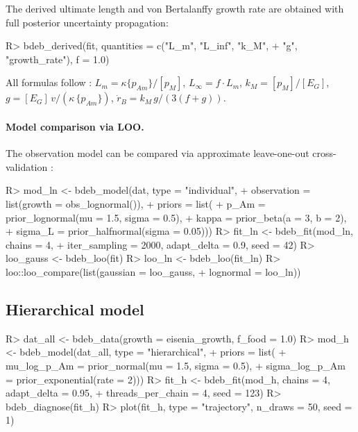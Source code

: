 \documentclass[article,shortnames]{jss}
\newcommand{\pAm}{\{p_{Am}\}}
\newcommand{\pM}{[p_M]}
\newcommand{\EG}{[E_G]}
\begin{document}
The derived ultimate length and von Bertalanffy growth rate are
obtained with full posterior uncertainty propagation:
\begin{CodeChunk}
\begin{CodeInput}
R> bdeb_derived(fit, quantities = c("L_m", "L_inf", "k_M",
+    "g", "growth_rate"), f = 1.0)
\end{CodeInput}
\end{CodeChunk}
All formulas follow \citet[Table~3.1]{Kooijman2010}: $L_m = \kappa
\pAm / \pM$, $L_\infty = f \cdot L_m$, $k_M = \pM / \EG$,
$g = \EG \, v / (\kappa \, \pAm)$, $\dot{r}_B = k_M \, g / (3(f + g))$.

\paragraph{Model comparison via LOO.}
The observation model can be compared via approximate
leave-one-out cross-validation \citep{VehtariLOO2017}:
\begin{CodeChunk}
\begin{CodeInput}
R> mod_ln <- bdeb_model(dat, type = "individual",
+    observation = list(growth = obs_lognormal()),
+    priors = list(
+      p_Am  = prior_lognormal(mu = 1.5, sigma = 0.5),
+      kappa = prior_beta(a = 3, b = 2),
+      sigma_L = prior_halfnormal(sigma = 0.05)))
R> fit_ln <- bdeb_fit(mod_ln, chains = 4,
+    iter_sampling = 2000, adapt_delta = 0.9, seed = 42)
R> loo_gauss <- bdeb_loo(fit)
R> loo_ln    <- bdeb_loo(fit_ln)
R> loo::loo_compare(list(gaussian = loo_gauss,
+    lognormal = loo_ln))
\end{CodeInput}
\end{CodeChunk}

\subsection{Hierarchical model} \label{sec:ex_hier}

\begin{CodeChunk}
\begin{CodeInput}
R> dat_all <- bdeb_data(growth = eisenia_growth, f_food = 1.0)
R> mod_h <- bdeb_model(dat_all, type = "hierarchical",
+    priors = list(
+      mu_log_p_Am    = prior_normal(mu = 1.5, sigma = 0.5),
+      sigma_log_p_Am = prior_exponential(rate = 2)))
R> fit_h <- bdeb_fit(mod_h, chains = 4, adapt_delta = 0.95,
+    threads_per_chain = 4, seed = 123)
R> bdeb_diagnose(fit_h)
R> plot(fit_h, type = "trajectory", n_draws = 50, seed = 1)
\end{CodeInput}
\end{CodeChunk}
\end{document}
